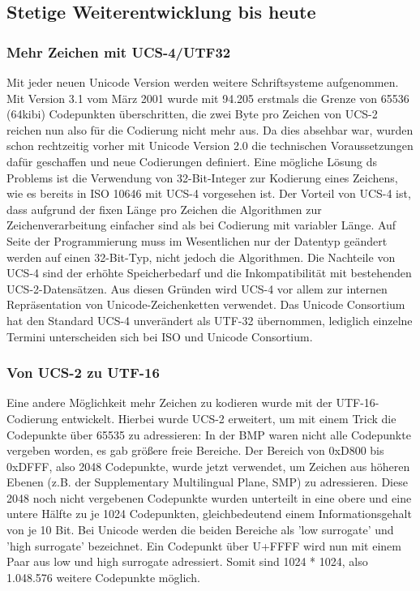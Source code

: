 \subsection{Stetige Weiterentwicklung bis heute}
\subsubsection{Mehr Zeichen mit UCS-4/UTF32}
Mit jeder neuen Unicode Version werden weitere Schriftsysteme aufgenommen. Mit Version 3.1 vom März 2001 wurde mit 94.205 erstmals die Grenze von 65536 (64kibi) Codepunkten überschritten, die zwei Byte pro Zeichen von UCS-2 reichen nun also für die Codierung nicht mehr aus. Da dies absehbar war, wurden schon rechtzeitig vorher mit Unicode Version 2.0 die technischen Voraussetzungen dafür geschaffen und neue Codierungen definiert. Eine mögliche Lösung ds Problems ist die Verwendung von 32-Bit-Integer zur Kodierung eines Zeichens, wie es bereits in ISO 10646 mit UCS-4 vorgesehen ist. Der Vorteil von UCS-4 ist, dass aufgrund der fixen Länge pro Zeichen die Algorithmen zur Zeichenverarbeitung einfacher sind als bei Codierung mit variabler Länge. Auf Seite der Programmierung muss im Wesentlichen nur der Datentyp geändert werden auf einen 32-Bit-Typ, nicht jedoch die Algorithmen. Die Nachteile von UCS-4 sind der erhöhte Speicherbedarf und die Inkompatibilität mit bestehenden UCS-2-Datensätzen. Aus diesen Gründen wird UCS-4 vor allem zur internen Repräsentation von Unicode-Zeichenketten verwendet. Das Unicode Consortium hat den Standard UCS-4 unverändert als UTF-32 übernommen, lediglich einzelne Termini unterscheiden sich bei ISO und Unicode Consortium.

\subsubsection{Von UCS-2 zu UTF-16}
Eine andere Möglichkeit mehr Zeichen zu kodieren wurde mit der UTF-16-Codierung entwickelt. Hierbei wurde UCS-2 erweitert, um mit einem Trick die Codepunkte über 65535 zu adressieren: In der BMP waren nicht alle Codepunkte vergeben worden, es gab größere freie Bereiche. Der Bereich von 0xD800 bis 0xDFFF, also 2048 Codepunkte, wurde jetzt verwendet, um Zeichen aus höheren Ebenen (z.B. der Supplementary Multilingual Plane, SMP) zu adressieren. Diese 2048 noch nicht vergebenen Codepunkte wurden unterteilt in eine obere und eine untere Hälfte zu je 1024 Codepunkten, gleichbedeutend einem Informationsgehalt von je 10 Bit. Bei Unicode werden die beiden Bereiche als 'low surrogate' und 'high surrogate' bezeichnet. Ein Codepunkt über U+FFFF wird nun mit einem Paar aus low und high surrogate adressiert. Somit sind 1024 * 1024, also 1.048.576 weitere Codepunkte möglich. 

